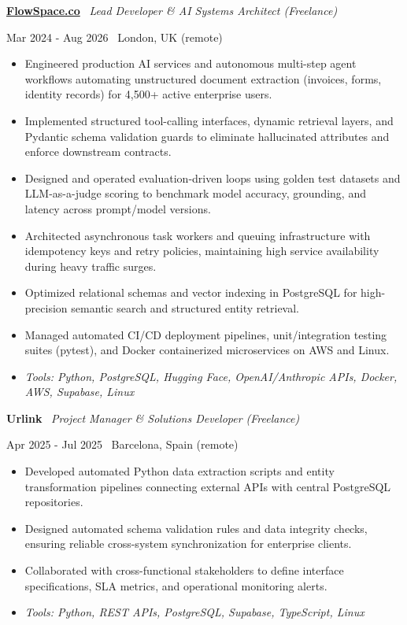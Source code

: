 \documentclass[a4paper,10pt]{article}
\newcommand{\role}[4]{%
 \vspace{2pt}\noindent
 \begin{minipage}[t]{0.70\textwidth}\raggedright\textbf{#1} \textbullet\ \textit{#3}\end{minipage}%
 \hfill
 \begin{minipage}[t]{0.28\textwidth}\raggedleft\footnotesize\color{gray}#2 \textbullet\ #4\end{minipage}%
 \vspace{1pt}%
}
\begin{document}
\role{\href{https://flowspace.co}{FlowSpace.co}}{Mar 2024 - Aug 2026}{Lead Developer \& AI Systems Architect (Freelance)}{London, UK (remote)}
\begin{itemize}
 \item Engineered production AI services and autonomous multi-step agent workflows automating unstructured document extraction (invoices, forms, identity records) for 4,500+ active enterprise users.
 \item Implemented structured tool-calling interfaces, dynamic retrieval layers, and Pydantic schema validation guards to eliminate hallucinated attributes and enforce downstream contracts.
 \item Designed and operated evaluation-driven loops using golden test datasets and LLM-as-a-judge scoring to benchmark model accuracy, grounding, and latency across prompt/model versions.
 \item Architected asynchronous task workers and queuing infrastructure with idempotency keys and retry policies, maintaining high service availability during heavy traffic surges.
 \item Optimized relational schemas and vector indexing in PostgreSQL for high-precision semantic search and structured entity retrieval.
 \item Managed automated CI/CD deployment pipelines, unit/integration testing suites (pytest), and Docker containerized microservices on AWS and Linux.
 \item \textit{Tools: Python, PostgreSQL, Hugging Face, OpenAI/Anthropic APIs, Docker, AWS, Supabase, Linux}
\end{itemize}

\role{Urlink}{Apr 2025 - Jul 2025}{Project Manager \& Solutions Developer (Freelance)}{Barcelona, Spain (remote)}
\begin{itemize}
 \item Developed automated Python data extraction scripts and entity transformation pipelines connecting external APIs with central PostgreSQL repositories.
 \item Designed automated schema validation rules and data integrity checks, ensuring reliable cross-system synchronization for enterprise clients.
 \item Collaborated with cross-functional stakeholders to define interface specifications, SLA metrics, and operational monitoring alerts.
 \item \textit{Tools: Python, REST APIs, PostgreSQL, Supabase, TypeScript, Linux}
\end{itemize}
\end{document}
